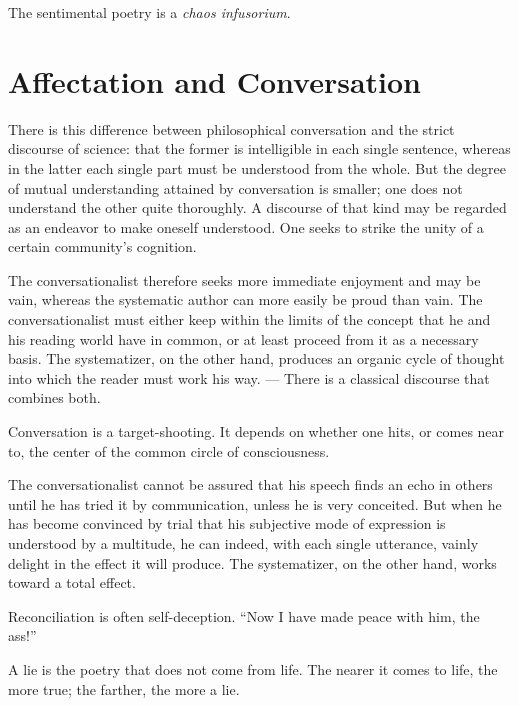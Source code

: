 \documentclass[12pt,a4paper]{article}
\newcommand{\opage}[1]{\marginnote{\footnotesize\textit{[#1]}}}
\newcommand{\aphsep}{\par\smallskip\centerline{\textasteriskcentered}\smallskip}
\begin{document}
\aphsep

The sentimental poetry is a \textit{chaos infusorium}.

\bigskip

\section*{Affectation and Conversation}
\label{ch:007}

There is this difference between philosophical conversation and the strict
discourse of science: that the former is intelligible in each single sentence,
whereas in the latter each single part must be understood from the whole. But the
degree of mutual understanding attained by conversation is smaller; one does not
understand the other quite thoroughly. A discourse of that kind may be regarded
as an endeavor to make oneself understood. One seeks to strike the unity of a
certain community's cognition.

The conversationalist therefore seeks more immediate enjoyment and may be vain,
whereas the systematic author can more easily be proud than vain. The
conversationalist must either keep within the limits of the concept that he and
his reading world have in common, or at least proceed from it as a necessary
basis. The systematizer, on the other hand, produces an organic cycle of thought
into which the reader must work his way. --- There is a classical discourse that
combines both.

\aphsep

Conversation is a target-shooting. It depends on whether one hits, or comes near
to, the center of the common circle of consciousness.

\opage{42}The conversationalist cannot be assured that his speech finds an echo in
others until he has tried it by communication, unless he is very conceited. But
when he has become convinced by trial that his subjective mode of expression is
understood by a multitude, he can indeed, with each single utterance, vainly
delight in the effect it will produce. The systematizer, on the other hand, works
toward a total effect.

\aphsep

Reconciliation is often self-deception. ``Now I have made peace with him, the
ass!''

\aphsep

A lie is the poetry that does not come from life. The nearer it comes to life, the
more true; the farther, the more a lie.
\end{document}
